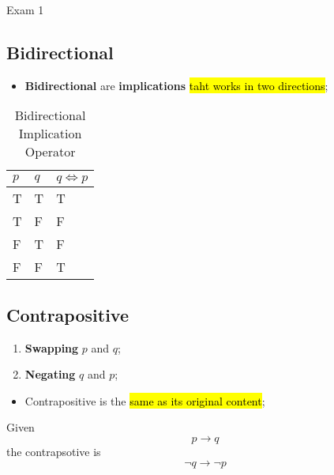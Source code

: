 \documentclass{note}
\begin{document}
\begin{note}{Exam 1}
        \subsection{Bidirectional}
        \begin{itemize}
            \item \textbf{Bidirectional} are \textbf{implications} \hl{taht works in two directions};
        \end{itemize}
        \begin{longtabu} to \textwidth{ | X[l, 1] | X[l, 1] | X[l, 2] | }
            \caption{Bidirectional Implication Operator}\\
            \hline
            $ p $ & $ q $ & $ q \Leftrightarrow p $ \\ \hline \hline
            T & T & T \\ \hline
            T & F & F \\ \hline
            F & T & F \\ \hline
            F & F & T \\ \hline
        \end{longtabu}

        \subsection{Contrapositive}
        \begin{enumerate}
            \item \textbf{Swapping} $ p $ and $ q $;
            \item \textbf{Negating} $ q $ and $ p $;
        \end{enumerate}
        \begin{itemize}
            \item Contrapositive is the \hl{same as its original content};
        \end{itemize}

        Given 
        \begin{displaymath}
            p \to q
        \end{displaymath}
        the contrapsotive is
        \begin{equation}\label{eq: contrapositive}
            \neg q \to \neg p
        \end{equation}


\end{note}
\end{document}
